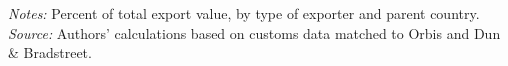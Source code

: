 \documentclass[11pt,a4paper]{article}
\begin{document}
\begin{table}[H]\centering\small%
  \caption{Other Goods: Share of Total Exports, by Parent Country}%
  \label{tab:f4tn_rest}%
  \par\vspace{3pt}%
  \begin{minipage}{0.95\textwidth}\footnotesize %
  \textit{Notes:} Percent of total export value, by type of exporter and parent country.\\[3pt]%
  \textit{Source:} Authors' calculations based on customs data matched to Orbis and Dun \& Bradstreet.%
  \end{minipage}%
  \end{table}
\end{document}
